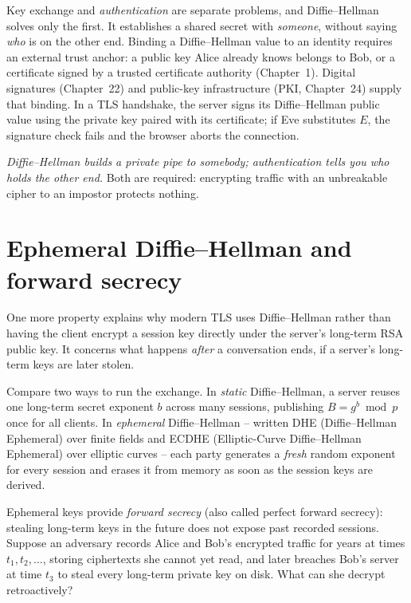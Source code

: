 Key exchange and \emph{authentication} are separate problems, and Diffie--Hellman solves only the first. It establishes a shared secret with \emph{someone}, without saying \emph{who} is on the other end. Binding a Diffie--Hellman value to an identity requires an external trust anchor: a public key Alice already knows belongs to Bob, or a certificate signed by a trusted certificate authority (Chapter~1). Digital signatures (Chapter~22) and public-key infrastructure (PKI, Chapter~24) supply that binding. In a TLS handshake, the server signs its Diffie--Hellman public value using the private key paired with its certificate; if Eve substitutes $E$, the signature check fails and the browser aborts the connection.

\begin{intuitionbox}
\emph{Diffie--Hellman builds a private pipe to somebody; authentication tells you who holds the other end.} Both are required: encrypting traffic with an unbreakable cipher to an impostor protects nothing.
\end{intuitionbox}

\section{Ephemeral Diffie--Hellman and forward secrecy}
\label{ch18:forward-secrecy}

One more property explains why modern TLS uses Diffie--Hellman rather than having the client encrypt a session key directly under the server's long-term RSA public key. It concerns what happens \emph{after} a conversation ends, if a server's long-term keys are later stolen.

Compare two ways to run the exchange. In \emph{static} Diffie--Hellman, a server reuses one long-term secret exponent $b$ across many sessions, publishing $B = g^b \bmod p$ once for all clients. In \emph{ephemeral} Diffie--Hellman -- written DHE (Diffie--Hellman Ephemeral) over finite fields and ECDHE (Elliptic-Curve Diffie--Hellman Ephemeral) over elliptic curves -- each party generates a \emph{fresh} random exponent for every session and erases it from memory as soon as the session keys are derived.

Ephemeral keys provide \emph{forward secrecy} (also called perfect forward secrecy): stealing long-term keys in the future does not expose past recorded sessions. Suppose an adversary records Alice and Bob's encrypted traffic for years at times $t_1, t_2, \dots$, storing ciphertexts she cannot yet read, and later breaches Bob's server at time $t_3$ to steal every long-term private key on disk. What can she decrypt retroactively?

